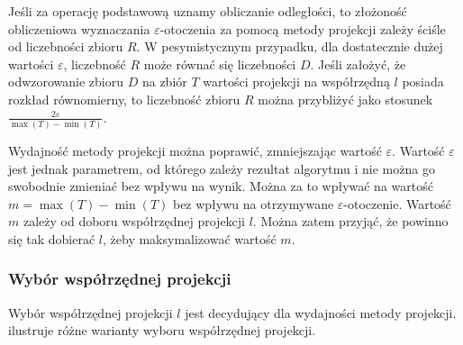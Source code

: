Jeśli za operację podstawową uznamy obliczanie odległości, to złożoność obliczeniowa wyznaczania $ \varepsilon $-otoczenia za pomocą metody projekcji zależy ściśle od liczebności zbioru $ R $. W pesymistycznym przypadku, dla dostatecznie dużej wartości $ \varepsilon $, liczebność $ R $ może równać się liczebności $ D $. Jeśli założyć, że odwzorowanie zbioru $ D $ na zbiór $ T $ wartości projekcji na współrzędną $ l $ posiada rozkład równomierny, to liczebność zbioru $ R $ można przybliżyć jako stosunek $ \frac{2\varepsilon}{\max(T)-\min(T)} $. 

Wydajność metody projekcji można poprawić, zmniejszając wartość $ \varepsilon $. Wartość $ \varepsilon $ jest jednak parametrem, od którego zależy rezultat algorytmu i nie można go swobodnie zmieniać bez wpływu na wynik. Można za to wpływać na wartość $ m=\max(T)-\min(T) $ bez wpływu na otrzymywane $ \varepsilon $-otoczenie. Wartość $ m $ zależy od doboru współrzędnej projekcji $ l $. Można zatem przyjąć, że powinno się tak dobierać $ l $, żeby maksymalizować wartość $ m $. 

\subsubsection{Wybór współrzędnej projekcji}
Wybór współrzędnej projekcji $ l $ jest decydujący dla wydajności metody projekcji.  ilustruje różne warianty wyboru współrzędnej projekcji. 

